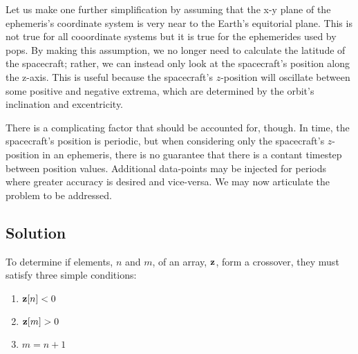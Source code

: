 Let us make one further simplification by assuming that the x-y plane of the
ephemeris's coordinate system is very near to the Earth's equitorial plane.
This is not true for all cooordinate systems but it is true for the ephemerides
used by \gls{pops}. By making this assumption, we no longer need to calculate
the latitude of the spacecraft; rather, we can instead only look at the
spacecraft's position along the z-axis. This is useful because the spacecraft's
$z$-position will oscillate between some positive and negative extrema, which
are determined by the orbit's inclination and excentricity. 

There is a complicating factor that should be accounted for, though. In time,
the spacecraft's position is periodic, but when considering only the
spacecraft's $z$-position in an ephemeris, there is no guarantee that there is
a contant timestep between position values. Additional data-points may be
injected for periods where greater accuracy is desired and vice-versa.  We may
now articulate the problem to be addressed.


\begin{center}
\end{center}

\subsection{Solution}

To determine if elements, $n$ and $m$, of an array, $\bm{\mathrm{z}}$, form a crossover,
they must satisfy three simple conditions:

\begin{center}
\begin{varwidth}{\textwidth}
\begin{enumerate}
    \item $\bm{\mathrm{z}}[n] < 0$
    \item $\bm{\mathrm{z}}[m] > 0$ 
    \item $m = n+1$
\end{enumerate}
\end{varwidth}
\end{center}

